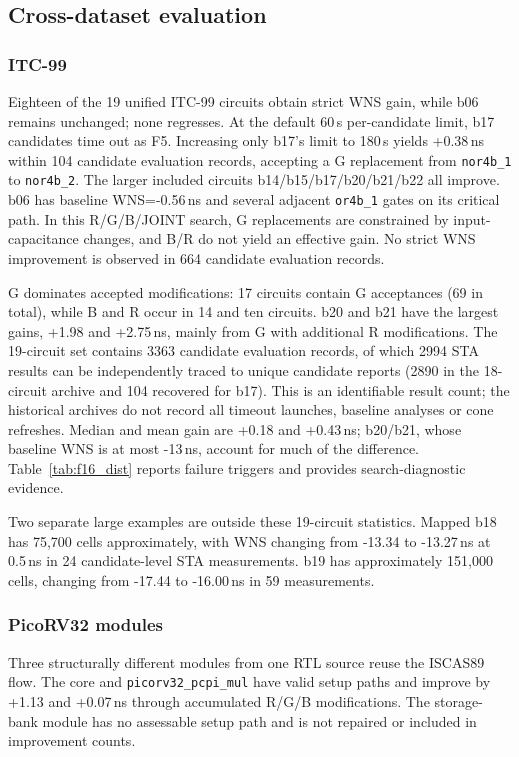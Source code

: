 \documentclass[preprint,12pt]{elsarticle}
\begin{document}
\FloatBarrier
\subsection{Cross-dataset evaluation}\label{sec:ood}
\subsubsection{ITC-99}\label{sec:itc99}
Eighteen of the 19 unified ITC-99 circuits obtain strict WNS gain, while b06 remains unchanged; none regresses. At the default 60\,s per-candidate limit, b17 candidates time out as F5. Increasing only b17's limit to 180\,s yields +0.38\,ns within 104 candidate evaluation records, accepting a G replacement from \texttt{nor4b\_1} to \texttt{nor4b\_2}. The larger included circuits b14/b15/b17/b20/b21/b22 all improve. b06 has baseline WNS=-0.56\,ns and several adjacent \texttt{or4b\_1} gates on its critical path. In this R/G/B/JOINT search, G replacements are constrained by input-capacitance changes, and B/R do not yield an effective gain. No strict WNS improvement is observed in 664 candidate evaluation records.

G dominates accepted modifications: 17 circuits contain G acceptances (69 in total), while B and R occur in 14 and ten circuits. b20 and b21 have the largest gains, +1.98 and +2.75\,ns, mainly from G with additional R modifications. The 19-circuit set contains 3363 candidate evaluation records, of which 2994 STA results can be independently traced to unique candidate reports (2890 in the 18-circuit archive and 104 recovered for b17). This is an identifiable result count; the historical archives do not record all timeout launches, baseline analyses or cone refreshes. Median and mean gain are +0.18 and +0.43\,ns; b20/b21, whose baseline WNS is at most -13\,ns, account for much of the difference. Table~\ref{tab:f16_dist} reports failure triggers and provides search-diagnostic evidence.

Two separate large examples are outside these 19-circuit statistics. Mapped b18 has 75,700 cells approximately, with WNS changing from -13.34 to -13.27\,ns at 0.5\,ns in 24 candidate-level STA measurements. b19 has approximately 151,000 cells, changing from -17.44 to -16.00\,ns in 59 measurements.

\subsubsection{PicoRV32 modules}
Three structurally different modules from one RTL source reuse the ISCAS89 flow. The core and \texttt{picorv32\_pcpi\_mul} have valid setup paths and improve by +1.13 and +0.07\,ns through accumulated R/G/B modifications. The storage-bank module has no assessable setup path and is not repaired or included in improvement counts.
\end{document}
